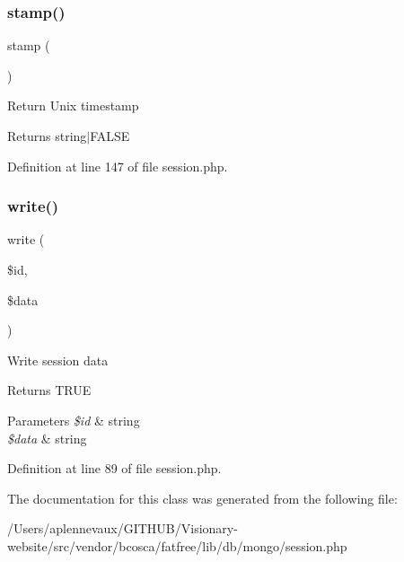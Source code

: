 \subsubsection{\texorpdfstring{stamp()}{stamp()}}
{\footnotesize\ttfamily stamp (\begin{DoxyParamCaption}{ }\end{DoxyParamCaption})}

Return Unix timestamp \begin{DoxyReturn}{Returns}
string$\vert$\+F\+A\+L\+SE 
\end{DoxyReturn}


Definition at line 147 of file session.\+php.

\hypertarget{class_d_b_1_1_mongo_1_1_session_a5f277b5f0e4e2154cddc9a3a0d2bf57d}{}\label{class_d_b_1_1_mongo_1_1_session_a5f277b5f0e4e2154cddc9a3a0d2bf57d} 
\subsubsection{\texorpdfstring{write()}{write()}}
{\footnotesize\ttfamily write (\begin{DoxyParamCaption}\item[{}]{\$id,  }\item[{}]{\$data }\end{DoxyParamCaption})}

Write session data \begin{DoxyReturn}{Returns}
T\+R\+UE 
\end{DoxyReturn}

\begin{DoxyParams}{Parameters}
{\em \$id} & string \\
\hline
{\em \$data} & string \\
\hline
\end{DoxyParams}


Definition at line 89 of file session.\+php.



The documentation for this class was generated from the following file\+:\begin{DoxyCompactItemize}
\item 
/\+Users/aplennevaux/\+G\+I\+T\+H\+U\+B/\+Visionary-\/website/src/vendor/bcosca/fatfree/lib/db/mongo/session.\+php\end{DoxyCompactItemize}
